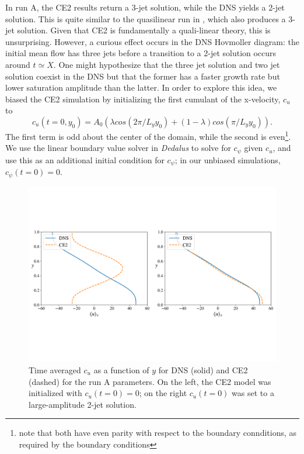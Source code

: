 \documentclass{jfm}
\begin{document}
In run A, the CE2 results return a 3-jet solution, while the DNS yields a 2-jet solution.
This is quite similar to the quasilinear run in \citet{2018RSPSA.47480422T}, which also produces a 3-jet solution.
Given that CE2 is fundamentally a quali-linear theory, this is unsurprising.
However, a curious effect occurs in the DNS Hovmoller diagram:
the initial mean flow has three jets before a transition to a 2-jet solution occurs around $t \simeq X$.
One might hypothesize that the three jet solution and two jet solution coexist in the DNS but that the former has a faster growth rate but lower saturation amplitude than the latter.
In order to explore this idea, we biased the CE2 simulation by initializing the first cumulant of the x-velocity, $c_u$ to
\begin{equation}
  \label{eq:bias}
  c_u(t=0, y_0) = A_0 \left( \lambda cos(2\pi/L_y y_0) + (1-\lambda) cos (\pi/L_y y_0)\right).
\end{equation}
The first term is odd about the center of the domain, while the second is even\footnote{note that both have even parity with respect to the boundary connditions, as required by the boundary conditions}.
We use the linear boundary value solver in \emph{Dedalus} to solve for $c_\psi$ given $c_u$, and use this as an additional initial condition for $c_\psi$; in our unbiased simulations, $c_\psi(t=0) = 0$.
\begin{figure}[h]
  \centering
  \includegraphics[width=\textwidth]{../../figs/umean_dns_ce2_runA_I.pdf}
  \caption{Time averaged $c_u$ as a function of $y$ for DNS (solid) and CE2 (dashed) for the run A parameters. On the left, the CE2 model was initialized with $c_u(t=0) = 0$; on the right $c_u(t=0)$ was set to a large-amplitude 2-jet solution.}
  \label{fig:cu_vs_y_runA}
\end{figure}
\end{document}
